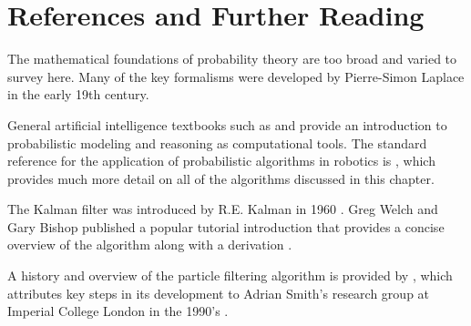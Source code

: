 \section{References and Further Reading}

The mathematical foundations of probability theory are too broad and
varied to survey here. Many of the key formalisms were developed by
Pierre-Simon Laplace in the early 19th century.

General artificial intelligence textbooks such as \parencite{Russell2003}
and \parencite{PooleMackworth17} provide an introduction to probabilistic
modeling and reasoning as computational tools.  The standard
reference for the application of probabilistic algorithms in robotics
is \parencite{thrun2005}, which provides much more detail on all of the
algorithms discussed in this chapter.

The Kalman filter was introduced by R.E. Kalman in 1960
\parencite{kalman1960}.  Greg Welch and Gary Bishop published a popular
tutorial introduction that provides a concise overview of the
algorithm along with a derivation \parencite{Welch1995b}.

A history and overview of the particle filtering algorithm is provided
by \parencite{godsill19}, which attributes key steps in its development to
Adrian Smith’s research group at Imperial College London in the
1990's \parencite{smith92}.


